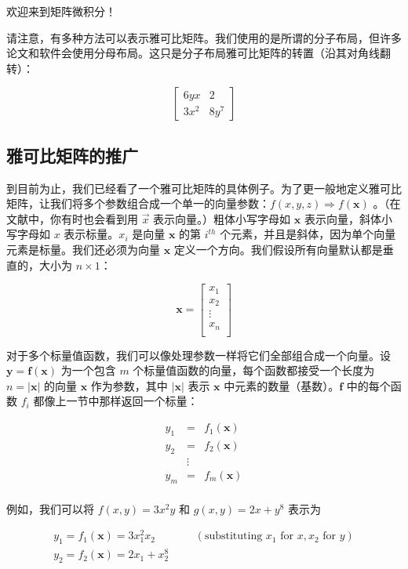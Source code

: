 \documentclass{ctexart}
\begin{document}
欢迎来到矩阵微积分！

请注意，有多种方法可以表示雅可比矩阵。我们使用的是所谓的分子布局，但许多论文和软件会使用分母布局。这只是分子布局雅可比矩阵的转置（沿其对角线翻转）：

\[
\begin{bmatrix}
	6yx & 2\\
	3x^2 & 8y^7
\end{bmatrix}
\]

\subsection{雅可比矩阵的推广}

到目前为止，我们已经看了一个雅可比矩阵的具体例子。为了更一般地定义雅可比矩阵，让我们将多个参数组合成一个单一的向量参数：$f(x, y, z) \Rightarrow f(\mathbf{x})$ 。（在文献中，你有时也会看到用 $\vec{x}$ 表示向量。）粗体小写字母如 $\mathbf{x}$ 表示向量，斜体小写字母如 $x$ 表示标量。$x_i$ 是向量 $\mathbf{x}$ 的第 $i^{th}$ 个元素，并且是斜体，因为单个向量元素是标量。我们还必须为向量 $\mathbf{x}$ 定义一个方向。我们假设所有向量默认都是垂直的，大小为 $n \times 1$：

\[\mathbf{x} = \begin{bmatrix}
           x_1\\
           x_2\\
           \vdots \\
           x_n\\
           \end{bmatrix}\]

对于多个标量值函数，我们可以像处理参数一样将它们全部组合成一个向量。设 $\mathbf{y} = \mathbf{f}(\mathbf{x})$ 为一个包含 $m$ 个标量值函数的向量，每个函数都接受一个长度为 $n=|\mathbf{x}|$ 的向量 $\mathbf{x}$ 作为参数，其中 $|\mathbf{x}|$ 表示 $\mathbf{x}$ 中元素的数量（基数）。$\mathbf{f}$ 中的每个函数 $f_i$ 都像上一节中那样返回一个标量：

\[
\begin{array}{lcl}
 y_1 & = & f_1(\mathbf{x})\\
 y_2 & = & f_2(\mathbf{x})\\
 & \vdots & \\
 y_m & = & f_m(\mathbf{x})\\
\end{array}\]

例如，我们可以将 $f(x,y) = 3x^2y$ 和 $g(x,y) = 2x + y^8$ 表示为

\[
\begin{array}{lllllllll}
 y_1 = f_1(\mathbf{x}) = 3x_1^2x_2  &&&(\text{substituting }x_1 \text{ for }x, x_2 \text{ for }y)\\
 y_2 = f_2(\mathbf{x}) = 2x_1 + x_2^8
\end{array}
\]
\end{document}
